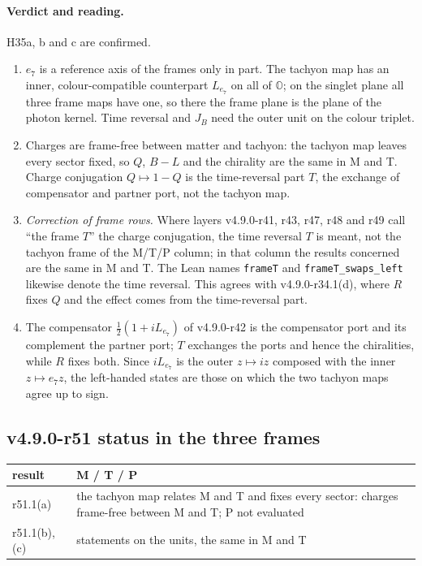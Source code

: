 \paragraph{Verdict and reading.}
H35a, b and c are confirmed.
\begin{enumerate}[leftmargin=2em]
\item \(e_7\) is a reference axis of the frames only in part.  The tachyon map has an inner, colour-compatible counterpart \(L_{e_7}\) on all of
\(\mathbb O\); on the singlet plane all three frame maps have one, so there the frame plane is the plane of the photon kernel.  Time reversal
and \(J_B\) need the outer unit on the colour triplet.
\item Charges are frame-free between matter and tachyon: the tachyon map leaves every sector fixed, so \(Q\), \(B-L\) and the chirality are the
same in M and T.  Charge conjugation \(Q\mapsto1-Q\) is the time-reversal part \(T\), the exchange of compensator and partner port, not the
tachyon map.
\item \emph{Correction of frame rows.}  Where layers v4.9.0-r41, r43, r47, r48 and r49 call ``the frame \(T\)'' the charge conjugation, the time
reversal \(T\) is meant, not the tachyon frame of the M/T/P column; in that column the results concerned are the same in M and T.  The Lean names
\texttt{frameT} and \texttt{frameT\_swaps\_left} likewise denote the time reversal.  This agrees with v4.9.0-r34.1(d), where \(R\) fixes \(Q\)
and the effect comes from the time-reversal part.
\item The compensator \(\tfrac12(1+iL_{e_7})\) of v4.9.0-r42 is the compensator port and its complement the partner port; \(T\) exchanges the
ports and hence the chiralities, while \(R\) fixes both.  Since \(iL_{e_7}\) is the outer \(z\mapsto iz\) composed with the inner
\(z\mapsto e_7z\), the left-handed states are those on which the two tachyon maps agree up to sign.
\end{enumerate}

\subsection*{v4.9.0-r51 status in the three frames}
\label{subsec:v490-r51-frames}

\begin{center}
\small
\begin{tabular}{@{}>{\raggedright\arraybackslash}p{}>{\raggedright\arraybackslash}p{}@{}}
\toprule
result & M / T / P\\
\midrule
r51.1(a) & the tachyon map relates M and T and fixes every sector: charges frame-free between M and T; P not evaluated\\
r51.1(b), (c) & statements on the units, the same in M and T\\
\bottomrule
\end{tabular}
\end{center}

